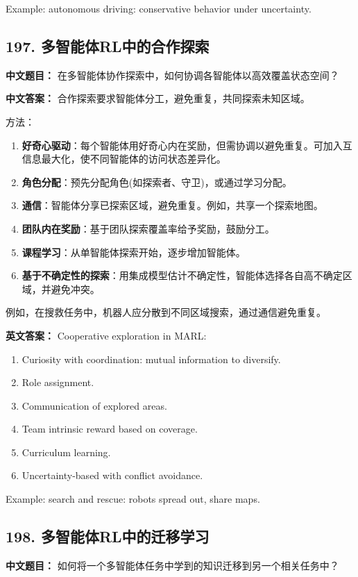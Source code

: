 \documentclass[10pt,a4paper]{ctexart}
\begin{document}
Example: autonomous driving: conservative behavior under uncertainty.

\subsection*{197. 多智能体RL中的合作探索}
\textbf{中文题目：} 在多智能体协作探索中，如何协调各智能体以高效覆盖状态空间？

\textbf{中文答案：}  
合作探索要求智能体分工，避免重复，共同探索未知区域。

方法：
\begin{enumerate}
    \item \textbf{好奇心驱动}：每个智能体用好奇心内在奖励，但需协调以避免重复。可加入互信息最大化，使不同智能体的访问状态差异化。
    \item \textbf{角色分配}：预先分配角色(如探索者、守卫)，或通过学习分配。
    \item \textbf{通信}：智能体分享已探索区域，避免重复。例如，共享一个探索地图。
    \item \textbf{团队内在奖励}：基于团队探索覆盖率给予奖励，鼓励分工。
    \item \textbf{课程学习}：从单智能体探索开始，逐步增加智能体。
    \item \textbf{基于不确定性的探索}：用集成模型估计不确定性，智能体选择各自高不确定区域，并避免冲突。
\end{enumerate}

例如，在搜救任务中，机器人应分散到不同区域搜索，通过通信避免重复。

\textbf{英文答案：}  
Cooperative exploration in MARL:

\begin{enumerate}
    \item Curiosity with coordination: mutual information to diversify.
    \item Role assignment.
    \item Communication of explored areas.
    \item Team intrinsic reward based on coverage.
    \item Curriculum learning.
    \item Uncertainty-based with conflict avoidance.
\end{enumerate}

Example: search and rescue: robots spread out, share maps.

\subsection*{198. 多智能体RL中的迁移学习}
\textbf{中文题目：} 如何将一个多智能体任务中学到的知识迁移到另一个相关任务中？
\end{document}
